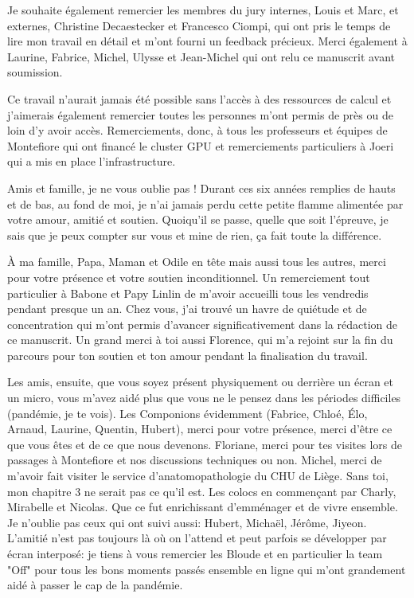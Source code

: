 \vspace{15pt}

Je souhaite également remercier les membres du jury internes, Louis et Marc, et externes, Christine Decaestecker et Francesco Ciompi, qui ont pris le temps de lire mon travail en détail et m'ont fourni un feedback précieux. Merci également à Laurine, Fabrice, Michel, Ulysse et Jean-Michel qui ont relu ce manuscrit avant soumission.

\vspace{15pt}

Ce travail n'aurait jamais été possible sans l'accès à des ressources de calcul et j'aimerais également remercier toutes les personnes m'ont permis de près ou de loin d'y avoir accès. Remerciements, donc, à tous les professeurs et équipes de Montefiore qui ont financé le cluster GPU et remerciements particuliers à Joeri qui a mis en place l'infrastructure.  

\vspace{15pt} 

Amis et famille, je ne vous oublie pas ! Durant ces six années remplies de hauts et de bas, au fond de moi, je n'ai jamais perdu cette petite flamme alimentée par votre amour, amitié et soutien. Quoiqu'il se passe, quelle que soit l'épreuve, je sais que je peux compter sur vous et mine de rien, ça fait toute la différence. 

À ma famille, Papa, Maman et Odile en tête mais aussi tous les autres, merci pour votre présence et votre soutien inconditionnel. Un remerciement tout particulier à Babone et Papy Linlin de m'avoir accueilli tous les vendredis pendant presque un an. Chez vous, j'ai trouvé un havre de quiétude et de concentration qui m'ont permis d'avancer significativement dans la rédaction de ce manuscrit. Un grand merci à toi aussi Florence, qui m'a rejoint sur la fin du parcours pour ton soutien et ton amour pendant la finalisation du travail. 

Les amis, ensuite, que vous soyez présent physiquement ou derrière un écran et un micro, vous m'avez aidé plus que vous ne le pensez dans les périodes difficiles (pandémie, je te vois). Les Componions évidemment (Fabrice, Chloé, Élo, Arnaud, Laurine, Quentin, Hubert), merci pour votre présence, merci d'être ce que vous êtes et de ce que nous devenons. Floriane, merci pour tes visites lors de passages à Montefiore et nos discussions techniques ou non. Michel, merci de m'avoir fait visiter le service d'anatomopathologie du CHU de Liège. Sans toi, mon chapitre 3 ne serait pas ce qu'il est. Les colocs en commençant par Charly, Mirabelle et Nicolas. Que ce fut enrichissant d'emménager et de vivre ensemble. Je n'oublie pas ceux qui ont suivi aussi: Hubert, Michaël, Jérôme, Jiyeon. L'amitié n'est pas toujours là où on l'attend et peut parfois se développer par écran interposé: je tiens à vous remercier les Bloude et en particulier la team "Off" pour tous les bons moments passés ensemble en ligne qui m'ont grandement aidé à passer le cap de la pandémie.

